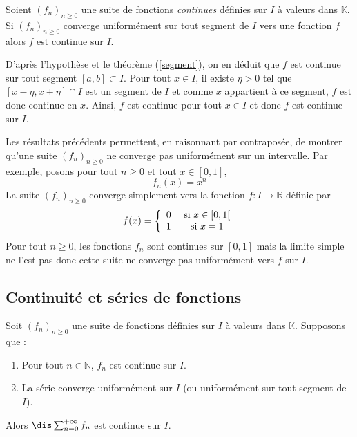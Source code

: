 \documentclass[a4paper,10pt]{report}
\begin{document}
\begin{prop} Soient $(f_n)_{n \geq 0}$ une suite de fonctions \textit{continues} définies sur $I$ à valeurs dans $\mathbb{K}$. Si $(f_n)_{n \geq 0}$ converge uniformément sur tout segment de $I$ vers une fonction $f$ alors $f$ est continue sur $I$.
\end{prop}

\begin{preuve} D'après l'hypothèse et le théorème (\ref{segment}), on en déduit que $f$ est continue sur tout segment $[a,b] \subset I$. Pour tout $x \in I$, il existe $\eta>0$ tel que $[x- \eta, x+ \eta] \cap I$ est un segment de $I$ et comme $x$ appartient à ce segment, $f$ est donc continue en $x$. Ainsi, $f$ est continue pour tout $x \in I$ et donc $f$ est continue sur $I$.
\end{preuve}

\medskip



\begin{rem} Les résultats précédents permettent, en raisonnant par contraposée, de montrer qu'une suite $(f_n)_{n \geq 0}$ ne converge pas uniformément sur un intervalle. Par exemple, posons pour tout $n \geq 0$ et tout $x \in [0,1]$,
$$ f_n(x) = x^n $$
La suite $(f_n)_{n \geq 0}$ converge simplement vers la fonction $f : I \rightarrow \mathbb{R}$ définie par 
$$  f(x) = \left\lbrace \begin{array}{ccl}
0 & \hbox{ si } x \in [0,1[ \\
1 & \hbox{ si } x =1 \\
\end{array}\right. $$
Pour tout $n \geq 0$, les fonctions $f_n$ sont continues sur $[0,1]$ mais la limite simple ne l'est pas donc cette suite ne converge pas uniformément vers $f$ sur $I$.
\end{rem}

\subsection{Continuité et séries de fonctions}

\begin{thm} Soit $(f_n)_{n \geq 0}$ une suite de fonctions définies sur $I$ à valeurs dans $\mathbb{K}$. Supposons que :

\begin{enumerate}
\item Pour tout $n \in \mathbb{N}$, $f_n$ est continue sur $I$.
\item La série converge uniformément sur $I$ (ou uniformément sur tout segment de $I$).
\end{enumerate}
Alors $\dis \sum_{n  =0}^{+ \infty} f_n$ est continue sur $I$.
\end{thm}
\end{document}
